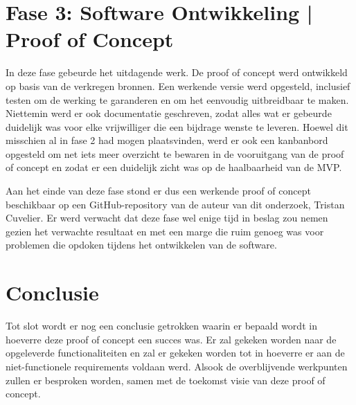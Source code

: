 \section{Fase 3: Software Ontwikkeling | Proof of Concept}
In deze fase gebeurde het uitdagende werk. De proof of concept werd ontwikkeld op basis van de verkregen bronnen. Een werkende versie werd opgesteld, inclusief testen om de werking te garanderen en om het eenvoudig uitbreidbaar te maken. Niettemin werd er ook documentatie geschreven, zodat alles wat er gebeurde duidelijk was voor elke vrijwilliger die een bijdrage wenste te leveren. Hoewel dit misschien al in fase 2 had mogen plaatsvinden, werd er ook een kanbanbord opgesteld om net iets meer overzicht te bewaren in de vooruitgang van de proof of concept en zodat er een duidelijk zicht was op de haalbaarheid van de MVP.

Aan het einde van deze fase stond er dus een werkende proof of concept beschikbaar op een GitHub-repository van de auteur van dit onderzoek, Tristan Cuvelier. 
Er werd verwacht dat deze fase wel enige tijd in beslag zou nemen gezien het verwachte resultaat en met een marge die ruim genoeg was voor problemen die opdoken tijdens het ontwikkelen van de software.

\section{Conclusie}


Tot slot wordt er nog een conclusie getrokken waarin er bepaald wordt in hoeverre deze proof of concept een succes was. Er zal gekeken worden naar de opgeleverde functionaliteiten en zal er gekeken worden tot in hoeverre er aan de niet-functionele requirements voldaan werd. Alsook de overblijvende werkpunten zullen er besproken worden, samen met de toekomst visie van deze proof of concept.